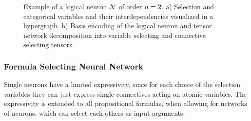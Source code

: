 
\begin{figure}[t]
    \begin{center}
        
    \end{center}
    \caption{Example of a logical neuron $\mathcal{N}$ of order $n=2$.
    a) Selection and categorical variables and their interdependencies visualized in a hypergraph.
    b) Basis encoding of the logical neuron and tensor network decomposition into variable selecting and connective selecting tensors.
    }
    \label{fig:neuronDecomposition}
\end{figure}


\subsubsection{Formula Selecting Neural Network}

Single neurons have a limited expressivity, since for each choice of the selection variables they can just express single connectives acting on atomic variables.
The expressivity is extended to all propositional formulas, when allowing for networks of neurons, which can select each others as input arguments.


